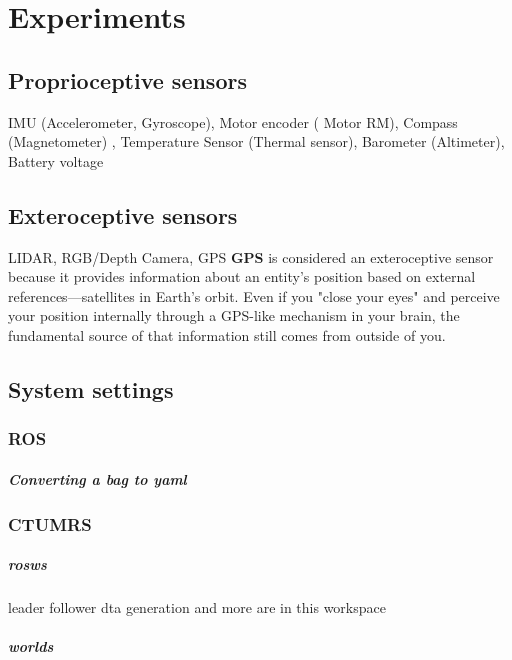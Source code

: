 \chapter{Experiments}



\section{Proprioceptive sensors} IMU (Accelerometer, Gyroscope), Motor encoder (	Motor RM), Compass (Magnetometer) , Temperature Sensor (Thermal sensor), Barometer (Altimeter), Battery voltage

\section{Exteroceptive sensors} LIDAR, RGB/Depth Camera, GPS
    \textbf{GPS} is considered an exteroceptive sensor because it provides information about an entity’s position based on external references—satellites in Earth's orbit. Even if you "close your eyes" and perceive your position internally through a GPS-like mechanism in your brain, the fundamental source of that information still comes from outside of you.


\section{System settings}
    \subsection{ROS}
        \paragraph{Converting a bag to yaml}
    \subsection{CTUMRS}
        \paragraph{rosws}
            leader follower dta generation and more are in this workspace
        
        \paragraph{worlds}
                
